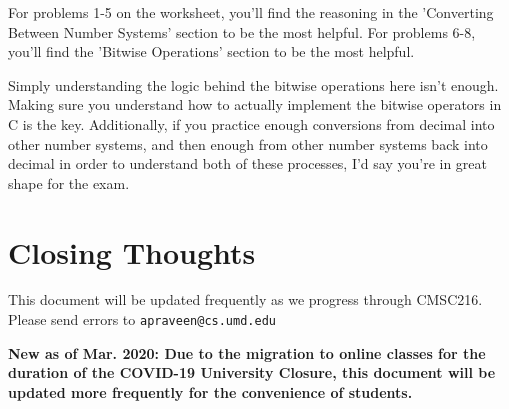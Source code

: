 \documentclass[english, 10pt]{article}
\begin{document}
For problems 1-5 on the worksheet, you'll find the reasoning in the 'Converting Between Number Systems' section to be the most helpful. For problems 6-8, you'll find the 'Bitwise Operations' section to be the most helpful.\newline

Simply understanding the logic behind the bitwise operations here isn't enough. Making sure you understand how to actually implement the bitwise operators in C is the key. Additionally, if you practice enough conversions from decimal into other number systems, and then enough from other number systems back into decimal in order to understand both of these processes, I'd say you're in great shape for the exam.












\section{Closing Thoughts}

This document will be updated frequently as we progress through CMSC216. Please send errors to \texttt{apraveen@cs.umd.edu}\newline

\textbf{New as of Mar. 2020: Due to the migration to online classes for the duration of the COVID-19 University Closure, this document will be updated more frequently for the convenience of students.}
\end{document}

